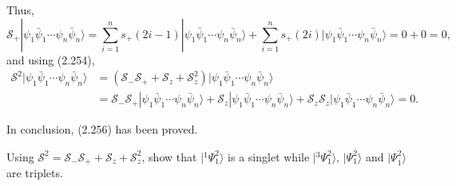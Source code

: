 \documentclass[a4paper]{book}
\newcounter{exercise}[chapter]
\newcounter{solution}[chapter]
\begin{document}
\begin{solution}
	Thus,
	\[
		\mathscr{S}_+ | \psi_1 \bar{\psi}_1 \cdots \psi_n \bar{\psi}_n \rangle = \sum_{ i=1 }^{ n } s_+(2i-1) | \psi_1 \bar{\psi}_1 \cdots \psi_n \bar{\psi}_n \rangle + \sum_{ i=1 }^{ n } s_+(2i) | \psi_1 \bar{\psi}_1 \cdots \psi_n \bar{\psi}_n \rangle = 0 + 0 = 0 ,
	\]	
	and	using (2.254),
	\begin{align*}
		\mathscr{S}^2 | \psi_1 \bar{\psi}_1 \cdots \psi_n \bar{\psi}_n \rangle &= ( \mathscr{S}_- \mathscr{S}_+ + \mathscr{S}_z + \mathscr{S}_z^2 ) | \psi_1 \bar{\psi}_1 \cdots \psi_n \bar{\psi}_n \rangle \\
		&= \mathscr{S}_- \mathscr{S}_+ | \psi_1 \bar{\psi}_1 \cdots \psi_n \bar{\psi}_n \rangle + \mathscr{S}_z | \psi_1 \bar{\psi}_1 \cdots \psi_n \bar{\psi}_n \rangle + \mathscr{S}_z \mathscr{S}_z | \psi_1 \bar{\psi}_1 \cdots \psi_n \bar{\psi}_n \rangle =  0 .
	\end{align*}
	
	In conclusion, (2.256) has been proved.
	
	\end{solution}
	
	\begin{exercise}
	Using $\mathscr{S}^2 = \mathscr{S}_- \mathscr{S}_+ + \mathscr{S}_z + \mathscr{S}^2_z$, show that $|{}^1 \Psi^2_1 \rangle$ is a singlet while $|{}^3 \Psi^2_1 \rangle$, $| \Psi^{\bar 2}_1 \rangle$ and $| \Psi^2_{\bar{1}} \rangle$ are triplets.
	\end{exercise}
	
\end{document}
